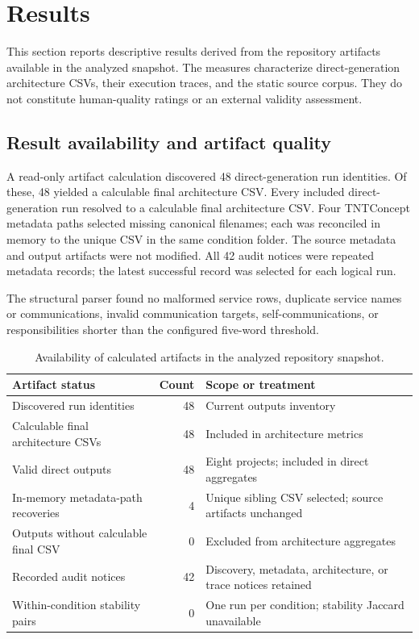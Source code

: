 \documentclass[acmsmall,screen,anonymous,review]{acmart}
\begin{document}
\section{Results}
\label{sec:results}

This section reports descriptive results derived from the repository artifacts available in the analyzed snapshot. The measures characterize direct-generation architecture CSVs, their execution traces, and the static source corpus. They do not constitute human-quality ratings or an external validity assessment.

\subsection{Result availability and artifact quality}

A read-only artifact calculation discovered 48 direct-generation run identities. Of these, 48 yielded a calculable final architecture CSV. Every included direct-generation run resolved to a calculable final architecture CSV. Four TNTConcept metadata paths selected missing canonical filenames; each was reconciled in memory to the unique CSV in the same condition folder. The source metadata and output artifacts were not modified. All 42 audit notices were repeated metadata records; the latest successful record was selected for each logical run.

The structural parser found no malformed service rows, duplicate service names or communications, invalid communication targets, self-communications, or responsibilities shorter than the configured five-word threshold.

\begin{table}[t]
\centering
\small
\begin{tabular}{lrl}
\toprule
Artifact status & Count & Scope or treatment \\
\midrule
Discovered run identities & 48 & Current outputs inventory \\
Calculable final architecture CSVs & 48 & Included in architecture metrics \\
Valid direct outputs & 48 & Eight projects; included in direct aggregates \\
In-memory metadata-path recoveries & 4 & Unique sibling CSV selected; source artifacts unchanged \\
Outputs without calculable final CSV & 0 & Excluded from architecture aggregates \\
Recorded audit notices & 42 & Discovery, metadata, architecture, or trace notices retained \\
Within-condition stability pairs & 0 & One run per condition; stability Jaccard unavailable \\
\bottomrule
\end{tabular}
\caption{Availability of calculated artifacts in the analyzed repository snapshot.}
\label{tab:result-availability}
\end{table}
\end{document}
